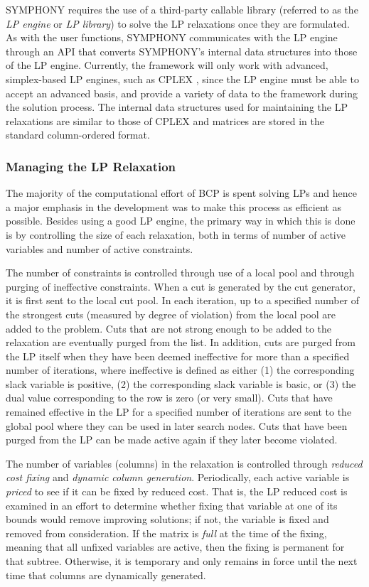 SYMPHONY requires the use of a third-party callable library (referred
to as the {\em LP engine} or {\em LP library}) to solve the LP
relaxations once they are formulated. As with the user functions,
SYMPHONY communicates with the LP engine through an API that converts
SYMPHONY's internal data structures into those of the LP engine.
Currently, the framework will only work with advanced, simplex-based
LP engines, such as CPLEX \cite{cplex}, since the LP engine must be
able to accept an advanced basis, and provide a variety of data to the
framework during the solution process. The internal data structures
used for maintaining the LP relaxations are similar to those of CPLEX
and matrices are stored in the standard column-ordered format.

\subsubsection{Managing the LP Relaxation}
\label{lp-relaxation}

The majority of the computational effort of BCP is spent
solving LPs and hence a major emphasis in the development was to make
this process as efficient as possible. Besides using a good LP engine,
the primary way in which this is done is by controlling the size of
each relaxation, both in terms of number of active variables and
number of active constraints. 

The number of constraints is controlled through use of a local
pool and through purging of ineffective constraints. When a cut is
generated by the cut generator, it is first sent to the local cut
pool. In each iteration, up to a specified number of the strongest
cuts (measured by degree of violation) from the local pool are added
to the problem. Cuts that are not strong enough to be added to the
relaxation are eventually purged from the list. In addition, cuts are
purged from the LP itself when they have been deemed ineffective for
more than a specified number of iterations, where ineffective is
defined as either (1) the corresponding slack variable is positive,
(2) the corresponding slack variable is basic, or (3) the dual value
corresponding to the row is zero (or very small). Cuts that have
remained effective in the LP for a specified number of iterations are
sent to the global pool where they can be used in later search nodes.
Cuts that have been purged from the LP can be made active again if
they later become violated.

The number of variables (columns) in the relaxation is controlled
through {\em reduced cost fixing} and {\em dynamic column generation}.
Periodically, each active variable is {\em priced} to see if it can be
fixed by reduced cost. That is, the LP reduced cost is examined in an
effort  to determine whether fixing that variable at
one of its bounds would remove improving solutions; if not, the
variable is fixed and removed from consideration. If the matrix is
{\em full} at the time of the fixing, meaning that all unfixed
variables are active, then the fixing is permanent for that subtree.
Otherwise, it is temporary and only remains in force until the next
time that columns are dynamically generated.

